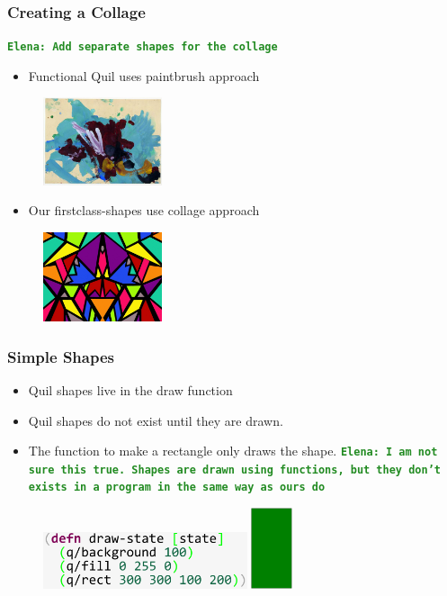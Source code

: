 \documentclass{beamer}
\newcommand{\comment}[1]{{\bf \tt  {#1}}}
\newcommand{\emcomment}[1]{\textcolor{ForestGreen}{\comment{Elena: {#1}}}}
\begin{document}
\begin{frame}
\frametitle{Creating a Collage}
\emcomment{Add separate shapes for the collage}
	\begin{itemize}
		\item Functional Quil uses paintbrush approach
	\end{itemize}
	\begin{figure}
	\includegraphics[width=3.5cm]{PresentationImages/painting.jpg}
	\end{figure}
	\begin{itemize}
		\item Our firstclass-shapes use collage approach
	\end{itemize}
	\begin{figure}
	\includegraphics[width=3.5cm]{PresentationImages/collage.jpg}
	\end{figure}
\end{frame}

\begin{frame}
\frametitle{Simple Shapes}
	\begin{itemize}
		\item Quil shapes live in the draw function 
		\item Quil shapes do not exist until they are drawn. 
		\item The function to make a rectangle only draws the shape. \emcomment{I am not sure this true. Shapes are drawn using functions, but they don't exists in a program in the same way as ours do}
	\end{itemize}
	\begin{figure}
		\includegraphics[width=6cm]{PresentationImages/quilGreenRect.pdf}
		\hspace{1cm}
		\includegraphics[width=1.2cm]{PresentationImages/ourGreenRect.pdf}
	\end{figure}
\end{frame}
\end{document}
